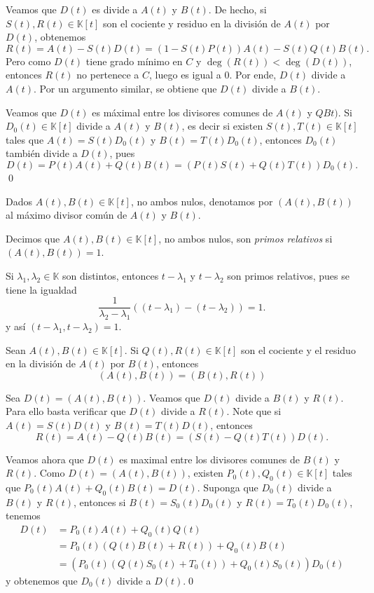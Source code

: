 Veamos que $D(t)$ es divide a $A(t)$ y $B(t)$. De hecho, si $S(t),R(t)\in \mathbb{K}[t]$ son el cociente y residuo en la división de $A(t)$ por $D(t)$, obtenemos
$$R(t)=A(t)-S(t)D(t)=\left(1-S(t)P(t)\right)A(t)-S(t)Q(t)B(t).$$
Pero como $D(t)$ tiene grado mínimo en $C$ y $\deg\left(R(t)\right)<\deg\left(D(t)\right)$, entonces $R(t)$ no pertenece a $C$, luego es igual a $0$. Por ende, $D(t)$ divide a $A(t)$. Por un argumento similar, se obtiene que $D(t)$ divide a $B(t)$.

Veamos que $D(t)$ es máximal entre los divisores comunes de $A(t)$ y $QBt)$. Si $D_0(t)\in \mathbb{K}[t]$ divide a $A(t)$ y $B(t)$, es decir si existen
$S(t),T(t)\in \mathbb{K}[t]$ tales que $A(t)=S(t)D_0(t)$ y $B(t)=T(t)D_0(t)$, entonces $D_0(t)$ también divide a $D(t)$, pues
\[
D(t)=P(t)A(t)+Q(t)B(t)=\left(P(t)S(t)+Q(t)T(t)\right)D_0(t).
\]
\qed

\begin{nota}
Dados $A(t),B(t)\in \mathbb{K}[t]$, no ambos nulos, denotamos por $\left(A(t),B(t)\right)$ al máximo divisor común de $A(t)$ y $B(t)$.
\end{nota}

\begin{defn}
  Decimos que $A(t),B(t)\in \mathbb{K}[t]$, no ambos nulos, son \emph{primos relativos} si $\left(A(t),B(t)\right)=1$.
\end{defn}

\begin{ejem}
Si $\lambda_1,\lambda_2\in \mathbb{K}$ son distintos, entonces $t-\lambda_1$ y $t-\lambda_2$ son primos relativos, pues se tiene la igualdad
\[
\frac{1}{\lambda_2-\lambda_1}\left( (t-\lambda_1)-(t-\lambda_2) \right)=1.
\]
y así $(t-\lambda_1,t-\lambda_2)=1$.
\end{ejem}

\begin{teo}
Sean $A(t),B(t)\in \mathbb{K}[t]$. Si $Q(t),R(t)\in \mathbb{K}[t]$ son el cociente y el residuo en la división de $A(t)$ por $B(t)$, entonces
$$\left(A(t),B(t)\right)=\left(B(t),R(t)\right) $$
\end{teo}

\dem Sea $D(t)=\left(A(t),B(t)\right)$. Veamos que $D(t)$ divide a $B(t)$ y $R(t)$. Para ello basta verificar que $D(t)$ divide a $R(t)$. Note que si $A(t)=S(t)D(t)$ y $B(t)=T(t)D(t)$, entonces $$R(t)=A(t)-Q(t)B(t)=\left(S(t)-Q(t)T(t)\right)D(t).$$

Veamos ahora que $D(t)$ es maximal entre los divisores comunes de $B(t)$ y $R(t)$. Como $D(t)=\left(A(t),B(t)\right)$, existen $P_0(t),Q_0(t)\in \mathbb{K}[t]$ tales que $P_0(t)A(t)+Q_0(t)B(t)=D(t)$.
Suponga que $D_0(t)$ divide a $B(t)$ y $R(t)$, entonces si $B(t)=S_0(t)D_0(t)$ y $R(t)=T_0(t)D_0(t)$, tenemos
\begin{align*}
D(t) & = P_0(t)A(t)+Q_0(t)Q(t)\\
 & =P_0(t)\left(Q(t)B(t)+R(t)\right)+Q_0(t)B(t)\\
 & =\left(P_0(t)\left(Q(t)S_0(t)+T_0(t)\right)+Q_0(t)S_0(t)\right)D_0(t)
\end{align*}
y obtenemos que $D_0(t)$ divide a $D(t)$.\qed

